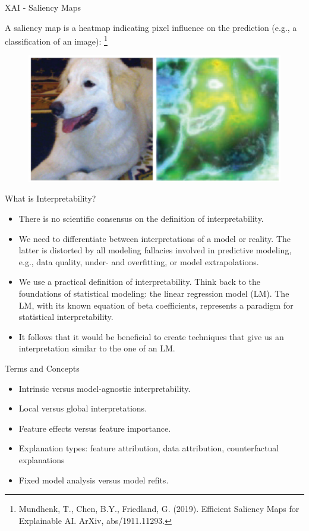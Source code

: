 \documentclass[11pt,compress,t,notes=noshow, xcolor=table]{beamer}
\begin{document}
\begin{vbframe}{XAI - Saliency Maps}

A saliency map is a heatmap indicating pixel influence on the prediction (e.g., a classification of an image): \footnote[frame]{Mundhenk, T., Chen, B.Y., Friedland, G. (2019). Efficient Saliency Maps for Explainable AI. ArXiv, abs/1911.11293.
}
\medskip
\begin{figure}
\includegraphics[width = 0.8 \textwidth]{figure/saliencymap}
\end{figure}
\end{vbframe}

\begin{vbframe}{What is Interpretability?}
\begin{itemize}
\itemsep1em
\item There is no scientific consensus on the definition of interpretability.
\item We need to differentiate between interpretations of a model or reality. The latter is distorted by all modeling fallacies involved in predictive modeling, e.g., data quality, under- and overfitting, or model extrapolations. 
\item We use a practical definition of interpretability.
Think back to the foundations of statistical modeling:  the linear regression model (LM). The LM, with its known equation of beta coefficients, represents a paradigm for statistical interpretability.
\item It follows that it would be beneficial to create techniques that give us an interpretation similar to the one of an LM.
\end{itemize}
\end{vbframe}




\begin{vbframe}{Terms and Concepts}
	\begin{itemize}
		\itemsep2em
		\item Intrinsic versus model-agnostic interpretability.
        \item Local versus global interpretations.
		\item Feature effects versus feature importance.
		\item Explanation types: feature attribution, data attribution, counterfactual explanations
		\item Fixed model analysis versus model refits.
	\end{itemize}
\end{vbframe}
\end{document}
